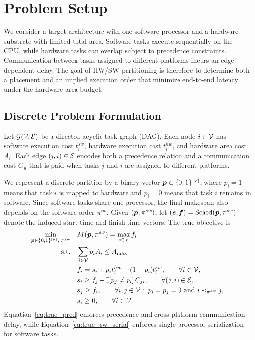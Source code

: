 \section{Problem Setup}
\label{sec:preliminaries}
We consider a target architecture with one software processor and a hardware substrate with limited total area. Software tasks execute sequentially on the CPU, while hardware tasks can overlap subject to precedence constraints. Communication between tasks assigned to different platforms incurs an edge-dependent delay. The goal of HW/SW partitioning is therefore to determine both a placement and an implied execution order that minimize end-to-end latency under the hardware-area budget.

\subsection{Discrete Problem Formulation}
Let $\mathcal{G}(\mathcal{V},\mathcal{E})$ be a directed acyclic task graph (DAG). Each node $i \in \mathcal{V}$ has software execution cost $t_i^{sw}$, hardware execution cost $t_i^{hw}$, and hardware area cost $A_i$. Each edge $(j,i)\in\mathcal{E}$ encodes both a precedence relation and a communication cost $C_{ji}$ that is paid when tasks $j$ and $i$ are assigned to different platforms.

We represent a discrete partition by a binary vector $\bm{p} \in \{0,1\}^{|\mathcal{V}|}$, where $p_i=1$ means that task $i$ is mapped to hardware and $p_i=0$ means that task $i$ remains in software. Since software tasks share one processor, the final makespan also depends on the software order $\pi^{sw}$. Given $(\bm{p},\pi^{sw})$, let $(\bm{s},\bm{f})=\mathrm{Sched}(\bm{p},\pi^{sw})$ denote the induced start-time and finish-time vectors. The true objective is
\begin{align}
\min_{\bm{p} \in \{0,1\}^{|\mathcal{V}|},\;\pi^{sw}} \quad
& M(\bm{p},\pi^{sw}) = \max_{i\in\mathcal{V}} f_i
\label{eq:true_obj}\\
\text{s.t.}\quad
& \sum_{i\in\mathcal{V}} p_i A_i \le A_{\max}, \label{eq:true_area}\\
& f_i = s_i + p_i t_i^{hw} + (1-p_i)t_i^{sw}, \qquad \forall i\in\mathcal{V}, \label{eq:true_finish}\\
& s_i \ge f_j + \mathbb{I}[p_j \neq p_i]\, C_{ji}, \qquad \forall (j,i)\in\mathcal{E}, \label{eq:true_pred}\\
& s_j \ge f_i, \qquad \forall i,j\in\mathcal{V}:\; p_i=p_j=0 \text{ and } i \prec_{\pi^{sw}} j, \label{eq:true_sw_serial}\\
& s_i \ge 0, \qquad \forall i\in\mathcal{V}. \label{eq:true_nonneg}
\end{align}
Equation~\eqref{eq:true_pred} enforces precedence and cross-platform communication delay, while Equation~\eqref{eq:true_sw_serial} enforces single-processor serialization for software tasks.


